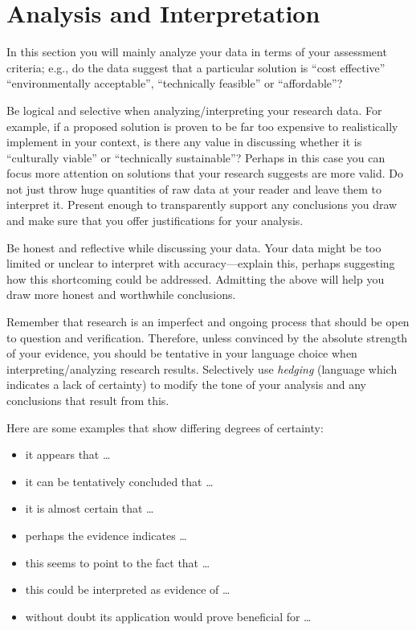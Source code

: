 \documentclass[peerreview]{IEEEtran}
\begin{document}
\section{Analysis and Interpretation}
 In this section you will mainly analyze your data in terms of your assessment criteria; e.g., do the data suggest that a particular solution is ``cost effective'' ``environmentally acceptable'', ``technically feasible'' or ``affordable''?

Be logical and selective when analyzing/interpreting your research data.  For example, if a proposed solution is proven to be far too expensive to realistically implement in your context, is there any value in discussing whether it is ``culturally viable'' or ``technically sustainable''? Perhaps in this case you can focus more attention on solutions that your research suggests are more valid.  Do not just throw huge quantities of raw data at your reader and leave them to interpret it. Present enough to transparently support any conclusions you draw and make sure that you offer justifications for your analysis.

Be honest and reflective while discussing your data. Your data might be too limited or unclear to interpret with accuracy---explain this, perhaps suggesting how this shortcoming could be addressed. Admitting the above will help you draw more honest and worthwhile conclusions.

Remember that research is an imperfect and ongoing process that should be open to question and verification. Therefore, unless convinced by the absolute strength of your evidence, you should be tentative in your language choice when interpreting/analyzing research results. Selectively use {\em hedging} (language which indicates a lack of certainty) to modify the tone of your analysis and any conclusions that result from this.

Here are some examples that show differing degrees of certainty:
\begin{itemize}
\item it appears that \ldots
\item it can be tentatively concluded that \ldots
\item it is almost certain that \ldots
\item perhaps the evidence indicates \ldots
\item this seems to point to the fact that \ldots
\item this could be interpreted as evidence of \ldots
\item without doubt its application would prove beneficial for \ldots
\end{itemize}
\end{document}
